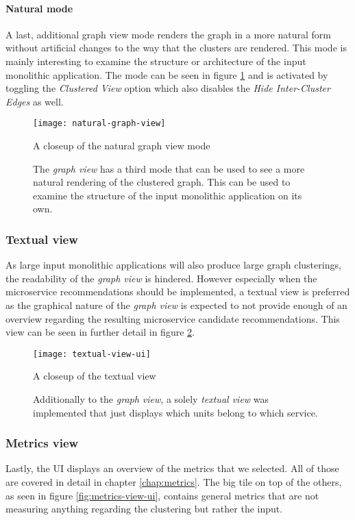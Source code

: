 \documentclass[12pt,a4paper]{report}
\begin{document}
\paragraph{Natural mode}
A last, additional graph view mode renders the graph in a more natural form
without artificial changes to the way that the clusters are rendered.
This mode is mainly interesting to examine the structure or architecture
of the input monolithic application.
The mode can be seen in figure \ref{fig:natural-graph-view} and is
activated by toggling the \textit{Clustered View} option which also disables
the \textit{Hide Inter-Cluster Edges} as well.

\begin{figure}[htbp]
\centering
\texttt{[image: natural-graph-view]}
\caption{A closeup of the natural graph view mode}
\caption*{
  The \textit{graph view} has a third mode that can be used to see a more
  natural rendering of the clustered graph. This can be used to examine
  the structure of the input monolithic application on its own.
}
\label{fig:natural-graph-view}
\end{figure}


\subsubsection{Textual view}
As large input monolithic applications will also produce large graph clusterings,
the readability of the \textit{graph view} is hindered.
However especially when the microservice recommendations should
be implemented, a textual view is preferred as the graphical nature of the
\textit{graph view} is expected to not provide enough of an overview regarding
the resulting microservice candidate recommendations.
This view can be seen in further detail in figure \ref{fig:textual-view-ui}.

\begin{figure}[htbp]
\centering
\texttt{[image: textual-view-ui]}
\caption{A closeup of the textual view}
\caption*{
  Additionally to the \textit{graph view}, a solely \textit{textual view}
  was implemented that just displays which units belong to which service.
}
\label{fig:textual-view-ui}
\end{figure}


\subsubsection{Metrics view}
Lastly, the UI displays an overview of the metrics that we selected.
All of those are covered in detail in chapter \ref{chap:metrics}.
The big tile on top of the others, as seen in figure \ref{fig:metrics-view-ui},
contains general metrics that are not measuring anything regarding the
clustering but rather the input.
\end{document}
